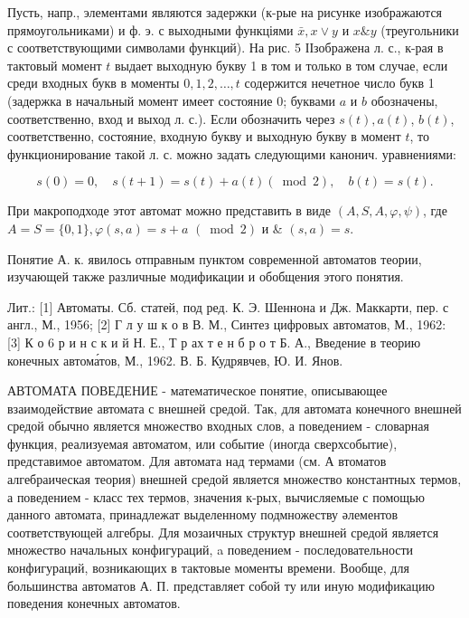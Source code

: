 \documentclass[10pt]{article}
\begin{document}
Пусть, напр., элементами являются задержки (к-рые на рисунке изображаются прямоугольниками) и ф. э. с выходными функціями $\bar{x}, x \vee y$ и $x \& y$ (треугольники с соответствующими символами функций). На рис. 5 ІІзображена л. с., к-рая в тактовый момент $t$ выдает выходную букву 1 в том и только в том случае, если среди входных букв в моменты $0,1,2, \ldots, t$ содержится нечетное число букв 1 (задержка в начальный момент имеет состояние 0; буквами $a$ и $b$ обозначены, соответственно, вход и выход л. с.). Если обозначить через $s(t), a(t)$, $b(t)$, соответственно, состояние, входную букву и выходную букву в момент $t$, то функционирование такой л. с. можно задать следующими канонич. уравнениями:



\[

s(0)=0, \quad s(t+1)=s(t)+a(t)(\bmod 2), \quad b(t)=s(t) .

\]



При макроподходе этот автомат можно представить в виде $(A, S, A, \varphi, \psi)$, где $A=S=\{0,1\}, \varphi(s, a)=s+a$ $(\bmod 2)$ и \& $(s, a)=s$.



Понятие А. к. явилось отправным пунктом современной автоматов теории, изучающей также различные модификации и обобщения этого понятия.



Лит.: [1] Автоматы. Сб. статей, под ред. К. Э. Шеннона и Дж. Маккарти, пер. с англ., М., 1956; [2] Г л у ш к о в В. М., Синтез цифровых автоматов, М., 1962: [3] К о 6 р и н с к и й Н. Е., Т р ах т е н б р о т Б. А., Введение в теорию конечных автома́тов, М., 1962. В. Б. Кудрявчев, Ю. И. Янов.



АВТОМАТА ПОВЕДЕНИЕ - математическое понятие, описывающее взаимодействие автомата с внешней средой. Так, для автомата конечного внешней средой обычно является множество входных слов, а поведением - словарная функция, реализуемая автоматом, или событие (иногда сверхсобытие), представимое автоматом. Для автомата над термами (см. А втоматов алгебраическая теория) внешней средой является множество константных термов, а поведением - класс тех термов, значения к-рых, вычисляемые с помощью данного автомата, принадлежат выделенному подмножеству әлементов соответствующей алгебры. Для мозаичных структур внешней средой является множество начальных конфигураций, a поведением - последовательности конфигураций, возникающих в тактовые моменты времени. Вообще, для большинства автоматов А. П. представляет собой ту или иную модификацию поведения конечных автоматов.
\end{document}
